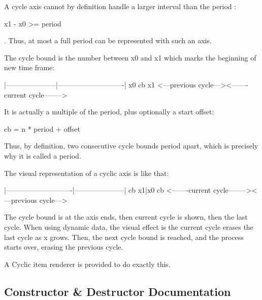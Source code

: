 A cycle axis cannot by definition handle a larger interval than the period \+: 
\begin{DoxyPre}x1 - x0 >= period\end{DoxyPre}
. Thus, at most a full period can be represented with such an axis.

The cycle bound is the number between x0 and x1 which marks the beginning of new time frame\+: 
\begin{DoxyPre}
|---------------------|----------------------------|
x0                   cb                           x1
<---previous cycle---><-------current cycle-------->
\end{DoxyPre}


It is actually a multiple of the period, plus optionally a start offset\+: 
\begin{DoxyPre}cb = n * period + offset\end{DoxyPre}


Thus, by definition, two consecutive cycle bounds period apart, which is precisely why it is called a period.

The visual representation of a cyclic axis is like that\+: 
\begin{DoxyPre}
|----------------------------|---------------------|
cb                         x1|x0                  cb
<-------current cycle--------><---previous cycle--->
\end{DoxyPre}


The cycle bound is at the axis ends, then current cycle is shown, then the last cycle. When using dynamic data, the visual effect is the current cycle erases the last cycle as x grows. Then, the next cycle bound is reached, and the process starts over, erasing the previous cycle.

A Cyclic item renderer is provided to do exactly this. 

\subsection{Constructor \& Destructor Documentation}
\mbox{\label{classorg_1_1jfree_1_1chart_1_1axis_1_1_cyclic_number_axis_a58586a50dcc2ea1e3ae036a81ca922df}} 
